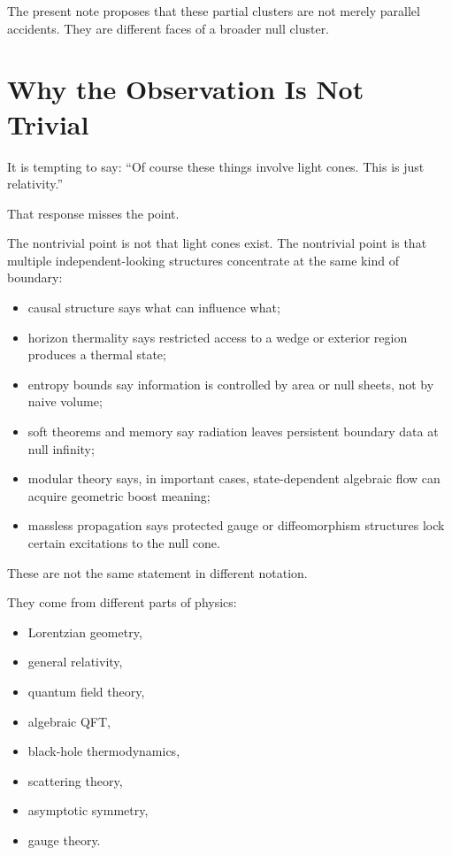 \documentclass[12pt,a4paper]{article}
\theoremstyle{definition}
\theoremstyle{remark}
\newcommand{\tightlist}{%
  \setlength{\itemsep}{0pt}\setlength{\parskip}{0pt}}
\begin{document}
The present note proposes that these partial clusters are not merely
parallel accidents. They are different faces of a broader null cluster.

\section{Why the Observation Is Not
Trivial}\label{why-the-observation-is-not-trivial}

It is tempting to say: ``Of course these things involve light cones.
This is just relativity.''

That response misses the point.

The nontrivial point is not that light cones exist. The nontrivial point
is that multiple independent-looking structures concentrate at the same
kind of boundary:

\begin{itemize}
\tightlist
\item
  causal structure says what can influence what;
\item
  horizon thermality says restricted access to a wedge or exterior
  region produces a thermal state;
\item
  entropy bounds say information is controlled by area or null sheets,
  not by naive volume;
\item
  soft theorems and memory say radiation leaves persistent boundary data
  at null infinity;
\item
  modular theory says, in important cases, state-dependent algebraic
  flow can acquire geometric boost meaning;
\item
  massless propagation says protected gauge or diffeomorphism structures
  lock certain excitations to the null cone.
\end{itemize}

These are not the same statement in different notation.

They come from different parts of physics:

\begin{itemize}
\tightlist
\item
  Lorentzian geometry,
\item
  general relativity,
\item
  quantum field theory,
\item
  algebraic QFT,
\item
  black-hole thermodynamics,
\item
  scattering theory,
\item
  asymptotic symmetry,
\item
  gauge theory.
\end{itemize}
\end{document}
